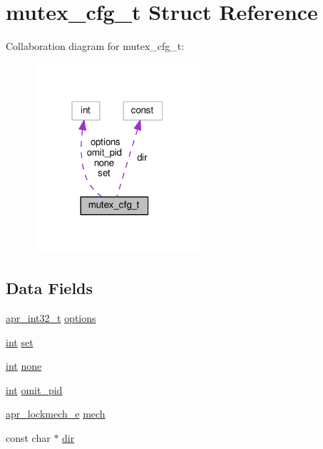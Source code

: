 \hypertarget{structmutex__cfg__t}{}\section{mutex\+\_\+cfg\+\_\+t Struct Reference}
\label{structmutex__cfg__t}


Collaboration diagram for mutex\+\_\+cfg\+\_\+t\+:
\nopagebreak
\begin{figure}[H]
\begin{center}
\leavevmode
\includegraphics[width=175pt]{structmutex__cfg__t__coll__graph}
\end{center}
\end{figure}
\subsection*{Data Fields}
\begin{DoxyCompactItemize}
\item 
\hyperlink{group__apr__platform_ga21ef1e35fd3ff9be386f3cb20164ff02}{apr\+\_\+int32\+\_\+t} \hyperlink{structmutex__cfg__t_aba69bfd427c5b37eb76c7f3c7fe5f4e7}{options}
\item 
\hyperlink{pcre_8txt_a42dfa4ff673c82d8efe7144098fbc198}{int} \hyperlink{structmutex__cfg__t_ab52c4e56323fd1de3afa6969477e5ef6}{set}
\item 
\hyperlink{pcre_8txt_a42dfa4ff673c82d8efe7144098fbc198}{int} \hyperlink{structmutex__cfg__t_af931fe78e12119415a63c6eec9f0421c}{none}
\item 
\hyperlink{pcre_8txt_a42dfa4ff673c82d8efe7144098fbc198}{int} \hyperlink{structmutex__cfg__t_a102a90b0a3cd83a21f206ac0fcf73baf}{omit\+\_\+pid}
\item 
\hyperlink{group__apr__proc__mutex_ga75dd95a48a1e855a87b509b522746ed4}{apr\+\_\+lockmech\+\_\+e} \hyperlink{structmutex__cfg__t_a63215de650d3150915cbfb08b80731fd}{mech}
\item 
const char $\ast$ \hyperlink{structmutex__cfg__t_a096ef6675379ee7f817f6143267b809b}{dir}
\end{DoxyCompactItemize}


